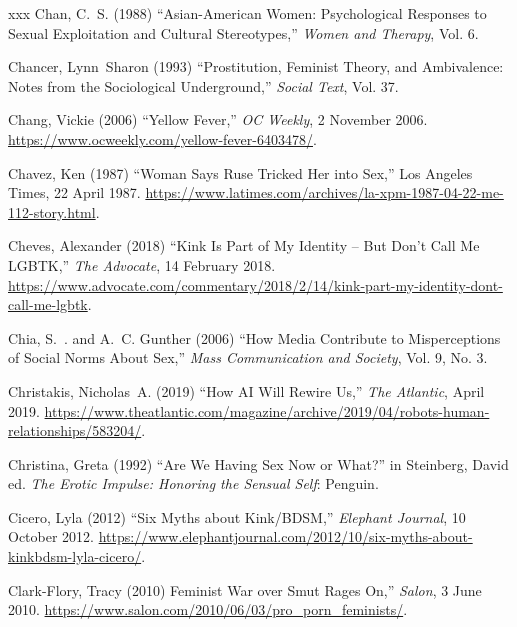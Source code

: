 \documentclass[]{jlreq} \usepackage{mystyle}
\begin{document}
\begin{thebibliography}{xxx}
Chan, C.~S. (1988) ``Asian-American Women: Psychological Responses to Sexual
  Exploitation and Cultural Stereotypes,'' \textit{ Women and Therapy}, Vol. 6.

Chancer, Lynn~Sharon (1993) ``Prostitution, Feminist Theory, and Ambivalence:
  Notes from the Sociological Underground,'' \textit{ Social Text}, Vol. 37.

Chang, Vickie (2006) ``Yellow Fever,'' \emph{OC Weekly}, 2 November 2006.
  \url{https://www.ocweekly.com/yellow-fever-6403478/}.

Chavez, Ken (1987) ``Woman Says Ruse Tricked Her into Sex,'' Los Angeles Times,
  22 April 1987.
  \url{https://www.latimes.com/archives/la-xpm-1987-04-22-me-112-story.html}.

Cheves, Alexander (2018) ``Kink Is Part of My Identity -- But Don't Call Me
  LGBTK,'' \emph{The Advocate}, 14 February 2018.
  \url{https://www.advocate.com/commentary/2018/2/14/kink-part-my-identity-dont-call-me-lgbtk}.

Chia, S.~. and A.~C. Gunther (2006) ``How Media Contribute to Misperceptions of
  Social Norms About Sex,'' \textit{ Mass Communication and Society}, Vol. 9,
  No. 3.

Christakis, Nicholas~A. (2019) ``How AI Will Rewire Us,'' \emph{The Atlantic},
  April 2019.
  \url{https://www.theatlantic.com/magazine/archive/2019/04/robots-human-relationships/583204/}.

Christina, Greta (1992) ``Are We Having Sex Now or What?'' in Steinberg, David
  ed.   \textit{ The Erotic Impulse: Honoring the Sensual Self}: Penguin.

Cicero, Lyla (2012) ``Six Myths about Kink/BDSM,'' \emph{Elephant Journal}, 10
  October 2012.
  \url{https://www.elephantjournal.com/2012/10/six-myths-about-kinkbdsm-lyla-cicero/}.

Clark-Flory, Tracy (2010)  Feminist War over Smut Rages On,'' \emph{Salon}, 3
  June 2010. \url{https://www.salon.com/2010/06/03/pro_porn_feminists/}.


\end{thebibliography}
\end{document}
